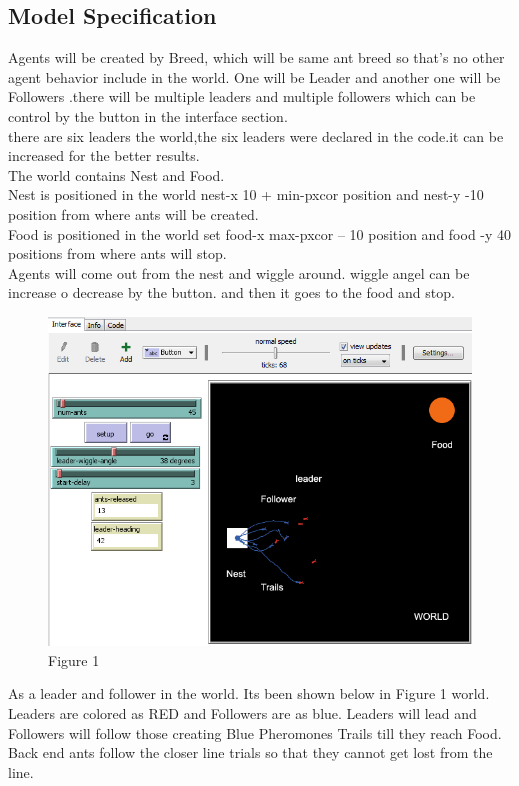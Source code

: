 \documentclass[conference]{IEEEtran}
\begin{document}
\subsection{Model Specification}
Agents will be created by Breed, which will be same ant breed so that's no other agent behavior include in the world. One will be Leader and another one will be Followers .there will be multiple leaders and multiple followers which can be control by the button in the interface section.\\
there are six leaders the world,the six leaders were declared in the code.it can be increased for the better results.\\
The world contains Nest and Food.\\ 
Nest is positioned in the world nest-x 10 + min-pxcor position and nest-y -10 position from where ants will be created.\\
Food is positioned in the world set food-x max-pxcor – 10 position and food -y 40 positions from where ants will stop. \\
Agents will come out from the nest and wiggle around. wiggle angel can be increase o decrease by the button. and then it goes to the food and stop.
\begin{figure}[!h]
\centering
\includegraphics[scale=0.4]{Model.png}
\caption{Figure 1}
\label{fig_sim}
\end{figure}
As a leader and follower in the world. Its been shown below in Figure 1 world. Leaders are colored as RED and Followers are as blue. Leaders will lead and Followers will follow those creating Blue Pheromones Trails till they reach Food. Back end ants follow the closer line trials so that they cannot get lost from the line.
\end{document}
